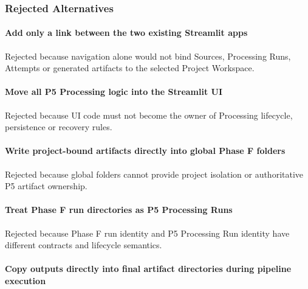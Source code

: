 \hypertarget{rejected-alternatives}{%
\subsubsection{Rejected Alternatives}\label{rejected-alternatives}}

\hypertarget{add-only-a-link-between-the-two-existing-streamlit-apps}{%
\paragraph{Add only a link between the two existing Streamlit apps}\label{add-only-a-link-between-the-two-existing-streamlit-apps}}

Rejected because navigation alone would not bind Sources, Processing Runs, Attempts or generated artifacts to the selected Project Workspace.

\hypertarget{move-all-p5-processing-logic-into-the-streamlit-ui}{%
\paragraph{Move all P5 Processing logic into the Streamlit UI}\label{move-all-p5-processing-logic-into-the-streamlit-ui}}

Rejected because UI code must not become the owner of Processing lifecycle, persistence or recovery rules.

\hypertarget{write-project-bound-artifacts-directly-into-global-phase-f-folders}{%
\paragraph{Write project-bound artifacts directly into global Phase F folders}\label{write-project-bound-artifacts-directly-into-global-phase-f-folders}}

Rejected because global folders cannot provide project isolation or authoritative P5 artifact ownership.

\hypertarget{treat-phase-f-run-directories-as-p5-processing-runs}{%
\paragraph{Treat Phase F run directories as P5 Processing Runs}\label{treat-phase-f-run-directories-as-p5-processing-runs}}

Rejected because Phase F run identity and P5 Processing Run identity have different contracts and lifecycle semantics.

\hypertarget{copy-outputs-directly-into-final-artifact-directories-during-pipeline-execution}{%
\paragraph{Copy outputs directly into final artifact directories during pipeline execution}\label{copy-outputs-directly-into-final-artifact-directories-during-pipeline-execution}}


